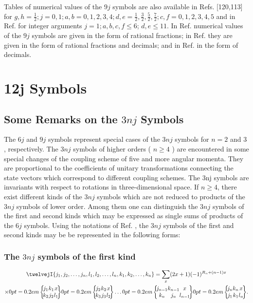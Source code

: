 Tables of numerical values of the $9 j$ symbols are also available in Refs. [120,113] for $g, h=\frac{1}{2} ; j=0,1 ; a, b= 0,1,2,3,4 ; d, e=\frac{1}{2}, \frac{3}{2}, \frac{5}{2}, \frac{7}{2} ; c, f=0,1,2,3,4,5$ and in Ref. \cite{ref128} for integer arguments $j=1 ; a, b, c, f \leq 6$; $d, e \leq 11$. In Ref. \cite{ref120} numerical values of the $9 j$ symbols are given in the form of rational fractions; in Ref. \cite{ref113} they are given in the form of rational fractions and decimals; and in Ref. \cite{ref128} in the form of decimals.

\section{12j Symbols}\label{sec:10.13}
\subsection{Some Remarks on the $3 n j$ Symbols}\label{sec:10.13.1}
The $6 j$ and $9 j$ symbols represent special cases of the $3 n j$ symbols for $n=2$ and 3 , respectively. The $3 n j$ symbols of higher orders ( $n \geq 4$ ) are encountered in some special changes of the coupling scheme of five and more angular momenta. They are proportional to the coefficients of unitary transformations connecting the state vectors which correspond to different coupling schemes. The 3nj symbols are invariants with respect to rotations in three-dimensional space. If $n \geq 4$, there exist different kinds of the $3 n j$ symbols which are not reduced to products of the $3 n j$ symbols of lower order. Among them one can distinguish the $3 n j$ symbols of the first and second kinds which may be expressed as single sums of products of the $6 j$ symbols. Using the notations of Ref. \cite{ref044}, the $3 n j$ symbols of the first and second kinds may be be represented in the following forms:

\subsubsection{The $3 n j$ symbols of the first kind}
\begin{multline}
\twelvejI{j_{1},j_{2},\ldots,j_{n},l_{1},l_{2},\ldots,l_{n},k_{1},k_{2},\ldots,k_{n}}=\sum_{x}(2 x+1)(-1)^{R_{n}+(n-1) x}  \\
 \times\sixj{j_{1}}{k_{1}}{x}{k_{2}}{j_{2}}{l_{1}}\sixj{j_{2}}{k_{2}}{x}{k_{3}}{j_{3}}{l_{2}} \ldots\sixj{j_{n-1}}{k_{n-1}}{x}{k_{n}}{j_{n}}{l_{n-1}}\sixj{j_{n}}{k_{n}}{x}{j_{1}}{k_{1}}{l_{n}} . \label{eq:10:13:1}
\end{multline}
